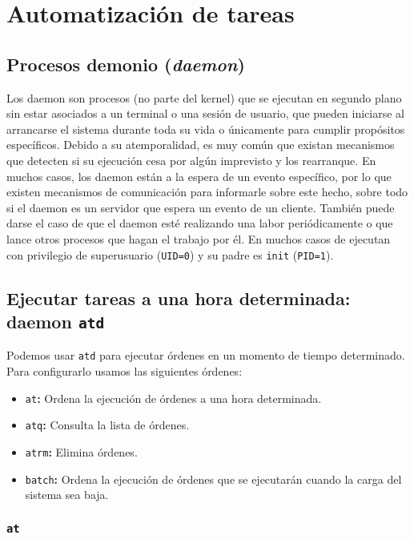 \section{Automatización de tareas}

\subsection{Procesos demonio (\emph{daemon})}

Los daemon son procesos (no parte del kernel) que se ejecutan en segundo plano sin estar asociados a un terminal o una sesión de usuario, que pueden iniciarse al arrancarse el sistema durante toda su vida o únicamente para cumplir propósitos específicos.
Debido a su atemporalidad, es muy común que existan mecanismos que detecten si su ejecución cesa por algún imprevisto y los rearranque.
En muchos casos, los daemon están a la espera de un evento específico, por lo que existen mecanismos de comunicación para informarle sobre este hecho, sobre todo si el daemon es un servidor que espera un evento de un cliente.
También puede darse el caso de que el daemon esté realizando una labor periódicamente o que lance otros procesos que hagan el trabajo por él.
En muchos casos de ejecutan con privilegio de superusuario (\texttt{UID=0}) y su padre es \texttt{init} (\texttt{PID=1}).

\subsection{Ejecutar tareas a una hora determinada: daemon \texttt{atd}}

Podemos usar \texttt{atd} para ejecutar órdenes en un momento de tiempo determinado.
Para configurarlo usamos las siguientes órdenes:

\begin{itemize}
	\item\texttt{at}\textbf{:} Ordena la ejecución de órdenes a una hora determinada.
	\item\texttt{atq}\textbf{:} Consulta la lista de órdenes.
	\item\texttt{atrm}\textbf{:} Elimina órdenes.
	\item\texttt{batch}\textbf{:} Ordena la ejecución de órdenes que se ejecutarán cuando la carga del sistema sea baja.
\end{itemize}

\subsubsection{\texttt{at}}

